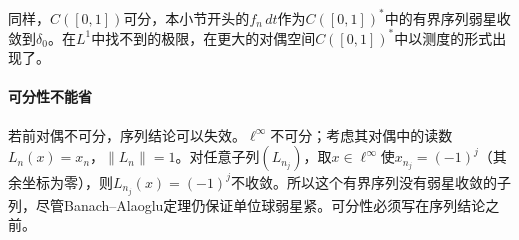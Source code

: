 同样，$C([0,1])$可分，本小节开头的$f_n\,dt$作为$C([0,1])^*$中的有界序列弱星收敛到$\delta_0$。在$L^1$中找不到的极限，在更大的对偶空间$C([0,1])^*$中以测度的形式出现了。

\paragraph{可分性不能省}
若前对偶不可分，序列结论可以失效。$\ell^\infty$不可分；考虑其对偶中的读数$L_n(x)=x_n$，$\|L_n\|=1$。对任意子列$(L_{n_j})$，取$x\in\ell^\infty$使$x_{n_j}=(-1)^j$（其余坐标为零），则$L_{n_j}(x)=(-1)^j$不收敛。所以这个有界序列没有弱星收敛的子列，尽管Banach--Alaoglu定理仍保证单位球弱星紧。可分性必须写在序列结论之前。
